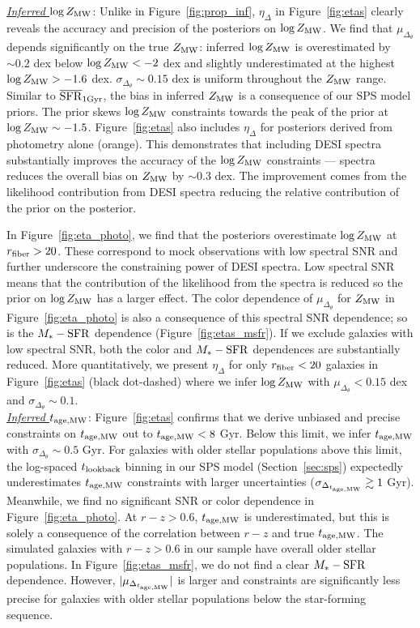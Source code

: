 \noindent \underline{\emph{Inferred $\log Z_{\rm MW}$}}:  
Unlike in Figure~\ref{fig:prop_inf}, $\eta_\Delta$ in Figure~\ref{fig:etas}
clearly reveals the accuracy and precision of the posteriors on $\log Z_{\rm MW}$. 
We find that $\mu_{\Delta_{\theta}}$ depends significantly on the true $Z_{\rm MW}$: 
inferred $\log Z_{\rm MW}$ is overestimated by ${\sim}0.2$ dex below $\log Z_{\rm MW} <
-2$ dex and slightly underestimated at the highest $\log Z_{\rm MW} > -1.6$ dex.
$\sigma_{\Delta_\theta} \sim 0.15$ dex is uniform throughout the $Z_{\rm MW}$ range.
Similar to $\overline{\rm SFR}_{\rm 1Gyr}$, the bias in inferred $Z_{\rm MW}$ is a consequence of our SPS
model priors. 
The prior skews $\log Z_{\rm MW}$ constraints towards the peak of the prior at
$\log Z_{\rm MW}\sim-1.5$. 
Figure~\ref{fig:etas} also includes $\eta_\Delta$ for posteriors derived from
photometry alone (orange). 
This demonstrates that including DESI spectra substantially improves the
accuracy of the $\log Z_{\rm MW}$ constraints --- spectra reduces the overall bias on
$Z_{\rm MW}$ by $\sim0.3$ dex. 
The improvement comes from the likelihood contribution from DESI spectra
reducing the relative contribution of the prior on the posterior. 

In Figure~\ref{fig:eta_photo}, we find that the posteriors overestimate
$\log Z_{\rm MW}$ at $r_{\rm fiber} > 20$. 
These correspond to mock observations with low spectral SNR and further
underscore the constraining power of DESI spectra. 
Low spectral SNR means that the contribution of the likelihood from the spectra
is reduced so the prior on $\log Z_{\rm MW}$ has a larger effect. 
The color dependence of $\mu_{\Delta_\theta}$ for $Z_{\rm MW}$ in
Figure~\ref{fig:eta_photo} is also a consequence of this spectral SNR
dependence; so is the $M_*-{\rm SFR}$ dependence (Figure~\ref{fig:etas_msfr}).
If we exclude galaxies with low spectral SNR, both the color and $M_*-{\rm
SFR}$  dependences are substantially reduced.
More quantitatively, we present $\eta_\Delta$ for only $r_{\rm fiber} < 20$
galaxies in Figure~\ref{fig:etas} (black dot-dashed) where we infer $\log Z_{\rm MW}$
with $\mu_{\Delta_\theta}<0.15$ dex and $\sigma_{\Delta_\theta}\sim0.1$. \\

\noindent \underline{\emph{Inferred $t_{\rm age, MW}$}}:  
Figure~\ref{fig:etas} confirms that we derive unbiased and precise constraints
on $t_{\rm age, MW}$ out to $t_{\rm age, MW} < 8$ Gyr. 
Below this limit, we infer $t_{\rm age, MW}$ with $\sigma_{\Delta_\theta}{\sim}0.5$ Gyr.
For galaxies with older stellar populations above this limit, the log-spaced
$t_{\rm lookback}$ binning in our SPS model (Section~\ref{sec:sps}) expectedly
underestimates $t_{\rm age, MW}$ constraints with larger uncertainties 
($\sigma_{\Delta_{t_{\rm age, MW}}} \gtrsim 1$ Gyr). 
Meanwhile, we find no significant SNR or color dependence in
Figure~\ref{fig:eta_photo}. 
At $r - z > 0.6$, $t_{\rm age, MW}$ is underestimated, but this is solely a consequence
of the correlation between $r-z$ and true $t_{\rm age, MW}$. 
The simulated galaxies with $r - z > 0.6$ in our sample have overall older
stellar populations. 
In Figure~\ref{fig:etas_msfr}, we do not find a clear $M_*-{\rm SFR}$
dependence. 
However, $|\mu_{\Delta_{t_{\rm age, MW}}}|$ is larger and constraints are significantly
less precise for galaxies with older stellar populations below the star-forming sequence.  \\

